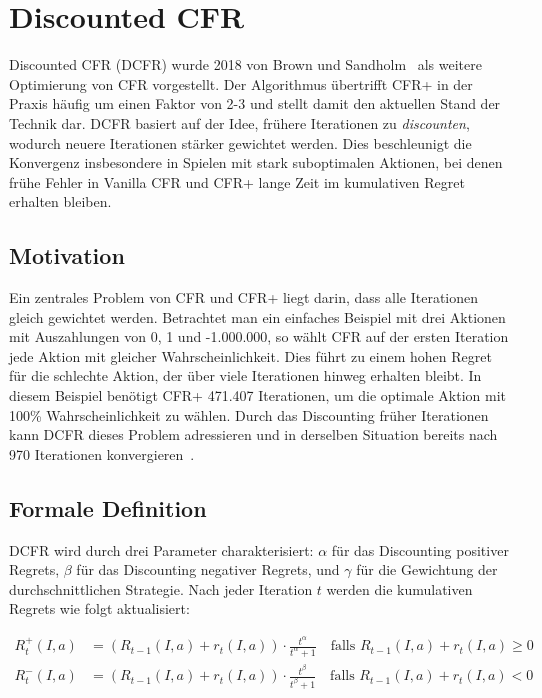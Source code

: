 \section{Discounted CFR}

Discounted CFR (DCFR) wurde 2018 von Brown und Sandholm~\cite{brown2018discounted} als weitere Optimierung von CFR vorgestellt.
Der Algorithmus übertrifft CFR+ in der Praxis häufig um einen Faktor von 2-3 und stellt damit den aktuellen Stand der Technik dar.
DCFR basiert auf der Idee, frühere Iterationen zu \textit{discounten}, wodurch neuere Iterationen stärker gewichtet werden.
Dies beschleunigt die Konvergenz insbesondere in Spielen mit stark suboptimalen Aktionen, bei denen frühe Fehler in Vanilla CFR und CFR+ lange Zeit im kumulativen Regret erhalten bleiben.

\subsection{Motivation}

Ein zentrales Problem von CFR und CFR+ liegt darin, dass alle Iterationen gleich gewichtet werden.
Betrachtet man ein einfaches Beispiel mit drei Aktionen mit Auszahlungen von 0, 1 und -1.000.000, so wählt CFR auf der ersten Iteration jede Aktion mit gleicher Wahrscheinlichkeit.
Dies führt zu einem hohen Regret für die schlechte Aktion, der über viele Iterationen hinweg erhalten bleibt.
In diesem Beispiel benötigt CFR+ 471.407 Iterationen, um die optimale Aktion mit 100\% Wahrscheinlichkeit zu wählen.
Durch das Discounting früher Iterationen kann DCFR dieses Problem adressieren und in derselben Situation bereits nach 970 Iterationen konvergieren~\cite{brown2018discounted}.

\subsection{Formale Definition}

DCFR wird durch drei Parameter charakterisiert: $\alpha$ für das Discounting positiver Regrets, $\beta$ für das Discounting negativer Regrets, und $\gamma$ für die Gewichtung der durchschnittlichen Strategie.
Nach jeder Iteration $t$ werden die kumulativen Regrets wie folgt aktualisiert:

\begin{align}
    R_t^+(I, a) &= (R_{t-1}(I, a) + r_t(I, a)) \cdot \frac{t^\alpha}{t^\alpha + 1} \quad \text{falls } R_{t-1}(I, a) + r_t(I, a) \geq 0 \label{eq:dcfr_positive} \\
    R_t^-(I, a) &= (R_{t-1}(I, a) + r_t(I, a)) \cdot \frac{t^\beta}{t^\beta + 1} \quad \text{falls } R_{t-1}(I, a) + r_t(I, a) < 0 \label{eq:dcfr_negative}
\end{align}


